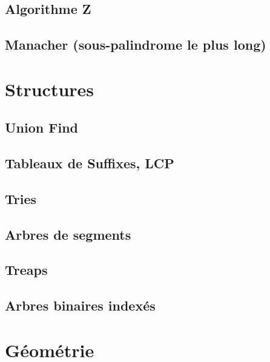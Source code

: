 \documentclass[10pt]{article}
\begin{document}
\subsection{Algorithme Z}
{\scriptsize}

\subsection{Manacher (sous-palindrome le plus long)}
{\scriptsize}


\section{Structures}
\subsection{Union Find}
{\scriptsize}

\subsection{Tableaux de Suffixes, LCP}
{\scriptsize}

\subsection{Tries}
{\scriptsize}

\subsection{Arbres de segments}
{\scriptsize}

\subsection{Treaps}
{\scriptsize}

\subsection{Arbres binaires indexés}
{\scriptsize}


\section{Géométrie}
\end{document}
